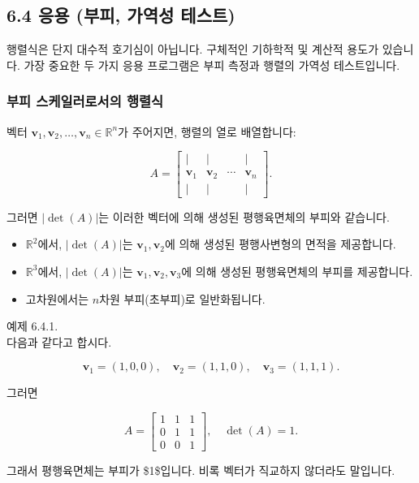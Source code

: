 \documentclass[
  12pt,
  a4paper,
]{article}
\begin{document}
\subsection{6.4 응용 (부피, 가역성 테스트)}\label{64-applications-volume-invertibility-test}

행렬식은 단지 대수적 호기심이 아닙니다. 구체적인 기하학적 및 계산적 용도가 있습니다. 가장 중요한 두 가지 응용 프로그램은 부피 측정과 행렬의 가역성 테스트입니다.

\subsubsection{부피 스케일러로서의 행렬식}\label{determinants-as-volume-scalers}

벡터 \(\mathbf{v}_1, \mathbf{v}_2, \dots, \mathbf{v}_n \in \mathbb{R}^n\)가 주어지면, 행렬의 열로 배열합니다:

\[A = \begin{bmatrix}
| & | & & | \\
\mathbf{v}_1 & \mathbf{v}_2 & \cdots & \mathbf{v}_n \\
| & | & & |
\end{bmatrix}.\]

그러면 \(|\det(A)|\)는 이러한 벡터에 의해 생성된 평행육면체의 부피와 같습니다.

\begin{itemize}
\item
  \(\mathbb{R}^2\)에서, \(|\det(A)|\)는 \(\mathbf{v}_1, \mathbf{v}_2\)에 의해 생성된 평행사변형의 면적을 제공합니다.
\item
  \(\mathbb{R}^3\)에서, \(|\det(A)|\)는 \(\mathbf{v}_1, \mathbf{v}_2, \mathbf{v}_3\)에 의해 생성된 평행육면체의 부피를 제공합니다.
\item
  고차원에서는 \(n\)차원 부피(초부피)로 일반화됩니다.
\end{itemize}

예제 6.4.1.\\
다음과 같다고 합시다.

\[\mathbf{v}_1 = (1,0,0), \quad \mathbf{v}_2 = (1,1,0), \quad \mathbf{v}_3 = (1,1,1).\]

그러면

\[A = \begin{bmatrix}
1 & 1 & 1 \\
0 & 1 & 1 \\
0 & 0 & 1
\end{bmatrix}, \quad \det(A) = 1.\]

그래서 평행육면체는 부피가 \$1\$입니다. 비록 벡터가 직교하지 않더라도 말입니다.
\end{document}
